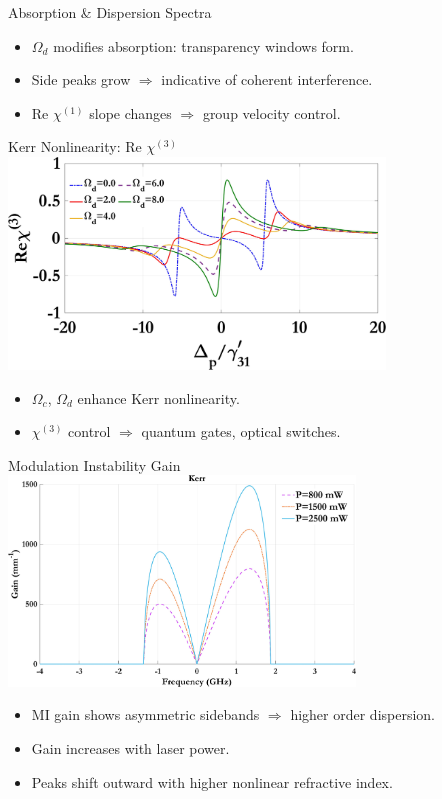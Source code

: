 \documentclass[12pt,aspectratio=1610]{beamer}
\begin{document}
\begin{frame}{Absorption \& Dispersion Spectra}
\begin{figure}[h]
\begin{minipage}{0.48\textwidth}
      \subcaption{}
    \end{minipage}\label{fig:chi1_d}
   \end{figure}
   \begin{itemize}
    \item $\Omega_d$ modifies absorption: transparency windows form.
    \item Side peaks grow $\Rightarrow$ indicative of coherent interference.
    \item Re $\chi^{(1)}$ slope changes $\Rightarrow$ group velocity control.
  \end{itemize}
\end{frame}

\begin{frame}{Kerr Nonlinearity: Re $\chi^{(3)}$}
  \vspace{-4pt}
  \hspace*{43pt}
  \includegraphics[width=0.75\textwidth]{Assets/Real_chi3_Omega_d.jpeg}
  \begin{itemize}
    \item $\Omega_c$, $\Omega_d$ enhance Kerr nonlinearity.
    \item $\chi^{(3)}$ control $\Rightarrow$ quantum gates, optical switches.
  \end{itemize}
\end{frame}

\begin{frame}{Modulation Instability Gain}
  \hspace*{49pt}
  \includegraphics[width=0.69\textwidth]{Assets/G_v_Power.jpeg}
  \begin{itemize}
    \item MI gain shows asymmetric sidebands $\Rightarrow$ higher order dispersion.
    \item Gain increases with laser power.
    \item Peaks shift outward with higher nonlinear refractive index.
  \end{itemize}
\end{frame}
\end{document}
